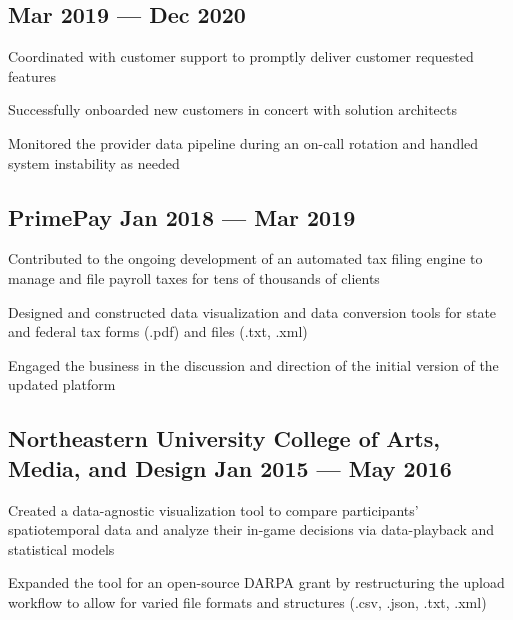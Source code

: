 \subsection{{\hfill Mar 2019 --- Dec 2020}}
\begin{zitemize}
\item Coordinated with customer support to promptly deliver customer requested features
\item Successfully onboarded new customers in concert with solution architects
\item Monitored the provider data pipeline during an on-call rotation and handled system instability as needed
\end{zitemize}

\subsection{{PrimePay \hfill Jan 2018 --- Mar 2019}}
\begin{zitemize}
\item Contributed to the ongoing development of an automated tax filing engine to manage and file payroll taxes for tens of thousands of clients
\item Designed and constructed data visualization and data conversion tools for state and federal tax forms (.pdf) and files (.txt, .xml)
\item Engaged the business in the discussion and direction of the initial version of the updated platform
\end{zitemize}

\subsection{{Northeastern University College of Arts, Media, and Design \hfill Jan 2015 --- May 2016}}
\begin{zitemize}
\item Created a data-agnostic visualization tool to compare participants' spatiotemporal data and analyze their in-game decisions via data-playback and statistical models
\item Expanded the tool for an open-source DARPA grant by restructuring the upload workflow to allow for varied file formats and structures (.csv, .json, .txt, .xml)
\end{zitemize}

